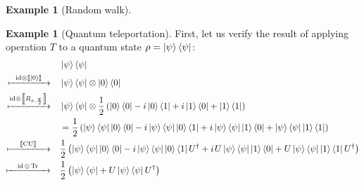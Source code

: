 \documentclass[10pt,a4paper]{amsart}
\theoremstyle{definition}
\theoremstyle{definition}
\newtheorem{example}[definition]{Example}
\theoremstyle{definition}
\theoremstyle{definition}
\theoremstyle{definition}
\theoremstyle{definition}
\begin{document}
\begin{example}[Random walk]
\begin{example}[Quantum teleportation]
First, let us verify the result  of applying operation  $T$ to a quantum state $\rho=\ket{\psi}\bra{\psi}$:
\begin{equation*} \label{eq:operation_T}
  \begin{split}
  &\ket{\psi} \bra{\psi}\\
 \xmapsto{ \hspace{6pt}\mathrm{id}\otimes \left \llbracket \ket{0} \right \rrbracket \hspace{6pt}} \quad & \ket{\psi} \bra{\psi} \otimes \ket{0} \bra{0} \\
  \xmapsto{ \mathrm{id}\otimes \left \llbracket R_{x,\frac{\pi}{2}} \right \rrbracket} \quad  & \ket{\psi} \bra{\psi} \otimes \frac{1}{2} \left( \ket{0}\bra{0} -i \ket{0}\bra{1} + i \ket{1}\bra{0} + \ket{1}\bra{1} \right)  \\
  & = \frac{1}{2} \left( \ket{\psi} \bra{\psi}  \ket{0}\bra{0} -i \ket{\psi} \bra{\psi}\ket{0}\bra{1} + i \ket{\psi} \bra{\psi} \ket{1}\bra{0} + \ket{\psi} \bra{\psi}  \ket{1}\bra{1} \right) \\
  \xmapsto{\hspace{12pt} \left \llbracket \text{CU} \right \rrbracket \hspace{12pt}} \quad & \frac{1}{2} \left( \ket{\psi} \bra{\psi} \ket{0}\bra{0} - i\ket{\psi} \bra{\psi}\ket{0}\bra{1} U^{\dag} + i \hspace{1pt} U\ket{\psi} \bra{\psi} \ket{1}\bra{0} + U \ket{\psi} \bra{\psi}  \ket{1}\bra{1}U^{\dag} \right) \\ 
  \xmapsto{ \hspace{10pt} \mathrm{id}\hspace{1pt}\otimes \hspace{1pt} \text{Tr}\hspace{10pt} } \quad & \frac{1}{2} \left(\ket{\psi} \bra{\psi} + U\ket{\psi} \bra{\psi}U^{\dag} \right) \\
  \end{split} 
\end{equation*}


\end{example}
\end{example}
\end{document}
